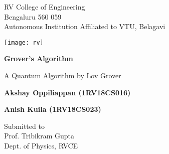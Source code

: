 \documentclass[a4paper]{article}
\begin{document}
\begin{titlepage}
   \begin{center}
       \vspace*{1cm}

       RV College of Engineering\\
       Bengaluru 560 059\\
       Autonomous Institution Affiliated to VTU, Belagavi

       \vspace{2.5cm}

       \texttt{[image: rv]}
       \vspace{0.5cm}

       \textbf{Grover's Algorithm}

       \vspace{0.5cm}
       A Quantum Algorithm by Lov Grover

       \vfill


       \textbf{Akshay Oppiliappan (1RV18CS016)}

       \textbf{Anish Kuila (1RV18CS023)}

       \vspace{1.5cm}

       Submitted to\\
       Prof. Tribikram Gupta \\
       Dept. of Physics, RVCE

       \vspace{0.8cm}



   \end{center}
\end{titlepage}
\pagebreak
\end{document}
